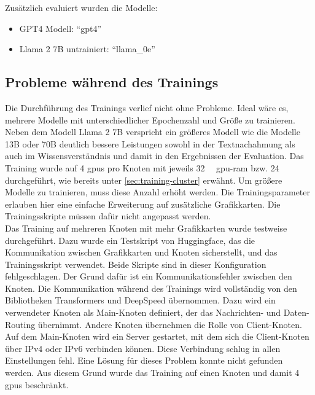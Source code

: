 Zusätzlich evaluiert wurden die Modelle:
\begin{itemize}
    \item GPT4 Modell: \enquote{gpt4}
    \item Llama 2 7B untrainiert: \enquote{llama\_$0$e}
\end{itemize}

\subsection{Probleme während des Trainings}\label{sec:problem-training}
Die Durchführung des Trainings verlief nicht ohne Probleme.
Ideal wäre es, mehrere Modelle mit unterschiedlicher Epochenzahl und Größe zu trainieren.
Neben dem Modell Llama 2 7B verspricht ein größeres Modell wie die Modelle 13B oder 70B deutlich bessere Leistungen sowohl in der Textnachahmung als auch im Wissensverständnis und damit in den Ergebnissen der Evaluation.
Das Training wurde auf 4 \ac{gpu}s pro Knoten mit jeweils \SI{32}{\giga\byte} \ac{gpu}-\ac{ram} bzw. \SI{24}{\giga\byte} durchgeführt, wie bereits unter \cref{sec:training-cluster} erwähnt.
Um größere Modelle zu trainieren, muss diese Anzahl erhöht werden.
Die Trainingsparameter erlauben hier eine einfache Erweiterung auf zusätzliche Grafikkarten.
Die Trainingsskripte müssen dafür nicht angepasst werden.\\

Das Training auf mehreren Knoten mit mehr Grafikkarten wurde testweise durchgeführt.
Dazu wurde ein Testskript von Huggingface, das die Kommunikation zwischen Grafikkarten und Knoten sicherstellt, und das Trainingsskript verwendet.
Beide Skripte sind in dieser Konfiguration fehlgeschlagen.
Der Grund dafür ist ein Kommunikationsfehler zwischen den Knoten.
Die Kommunikation während des Trainings wird vollständig von den Bibliotheken Transformers und DeepSpeed übernommen.
Dazu wird ein verwendeter Knoten als Main-Knoten definiert, der das Nachrichten- und Daten-Routing übernimmt.
Andere Knoten übernehmen die Rolle von Client-Knoten.
Auf dem Main-Knoten wird ein Server gestartet, mit dem sich die Client-Knoten über IPv4 oder IPv6 verbinden können.
Diese Verbindung schlug in allen Einstellungen fehl.
Eine Lösung für dieses Problem konnte nicht gefunden werden.
Aus diesem Grund wurde das Training auf einen Knoten und damit 4 \ac{gpu}s beschränkt.\\

